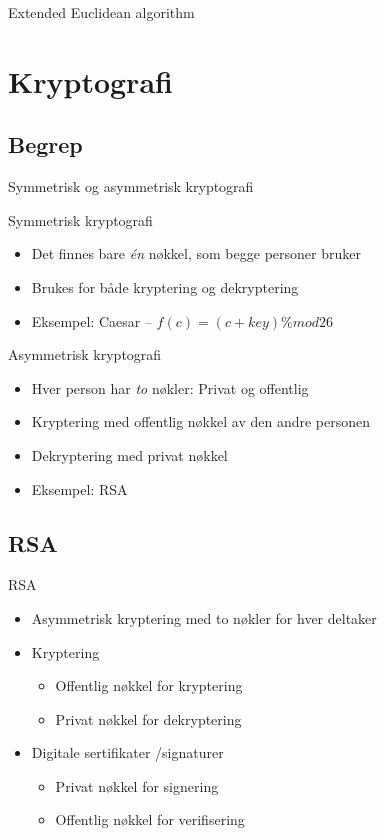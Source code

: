 \begin{frame}
Extended Euclidean algorithm
\end{frame}


\section{Kryptografi}
\subsection*{Begrep}
\begin{frame}{Symmetrisk og asymmetrisk kryptografi}
\begin{block}{Symmetrisk kryptografi}
\begin{itemize}
\item Det finnes bare \textit{én} nøkkel, som begge personer bruker
\item Brukes for både kryptering og dekryptering
\item Eksempel: Caesar – $f(c) = (c+key) \% mod 26$
\end{itemize}
\end{block}
\begin{block}{Asymmetrisk kryptografi}
\begin{itemize}
\item Hver person har \textit{to} nøkler: Privat og offentlig
\item Kryptering med offentlig nøkkel av den andre personen
\item Dekryptering med privat nøkkel
\item Eksempel: RSA
\end{itemize}
\end{block}
\end{frame}

\subsection*{RSA}
\begin{frame}{RSA}
\begin{itemize}
\item Asymmetrisk kryptering med to nøkler for hver deltaker
\item Kryptering
	\begin{itemize}
	\item Offentlig nøkkel for kryptering
	\item Privat nøkkel for dekryptering
	\end{itemize}
\item Digitale sertifikater /signaturer
	\begin{itemize}
	\item Privat nøkkel for signering
	\item Offentlig nøkkel for verifisering
	\end{itemize}
\end{itemize}
\end{frame}


